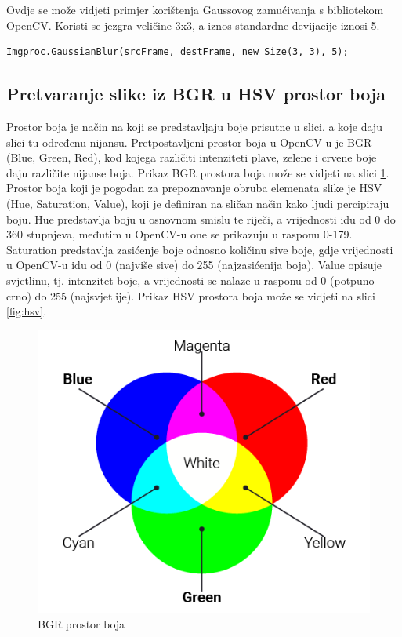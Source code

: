 \documentclass[times, utf8, zavrsni, numeric]{fer}
\begin{document}
Ovdje se može vidjeti primjer korištenja Gaussovog zamućivanja s bibliotekom OpenCV. Koristi se jezgra veličine 3x3, a iznos standardne devijacije iznosi 5.
\begin{lstlisting}
Imgproc.GaussianBlur(srcFrame, destFrame, new Size(3, 3), 5);
\end{lstlisting}

\subsection{Pretvaranje slike iz BGR u HSV prostor boja}
Prostor boja je način na koji se predstavljaju boje prisutne u slici, a koje daju slici tu određenu nijansu. Pretpostavljeni prostor boja u OpenCV-u je BGR (Blue, Green, Red), kod kojega različiti intenziteti plave, zelene i crvene boje daju različite nijanse boja\cite{colore}. Prikaz BGR prostora boja može se vidjeti na slici \ref{fig:bgr}.\\

Prostor boja koji je pogodan za prepoznavanje obruba elemenata slike je HSV (Hue, Saturation, Value), koji je definiran na sličan način kako ljudi percipiraju boju. Hue predstavlja boju u osnovnom smislu te riječi, a vrijednosti idu od 0 do 360 stupnjeva, međutim u OpenCV-u one se prikazuju u rasponu 0-179. Saturation predstavlja zasićenje boje odnosno količinu sive boje, gdje vrijednosti u OpenCV-u idu od 0 (najviše sive) do 255 (najzasićenija boja). Value opisuje svjetlinu, tj. intenzitet boje, a vrijednosti se nalaze u rasponu od 0 (potpuno crno) do 255 (najsvjetlije)\cite{colorh}. Prikaz HSV prostora boja može se vidjeti na slici \ref{fig:hsv}.

\begin{figure}[h]
	\includegraphics[scale=0.55]{bgr.png}
	\centering
	\caption{BGR prostor boja\cite{rgb}}
	\label{fig:bgr}
\end{figure}
\end{document}
